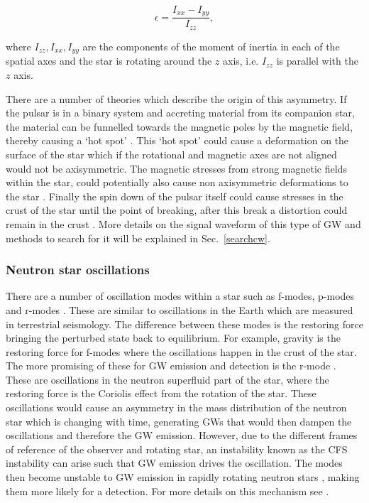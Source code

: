 \begin{equation}
\label{intro:source:cw:ellipticity}
\epsilon = \frac{I_{xx}-I_{yy}}{I_{zz}},
\end{equation}

where $I_{zz},I_{xx},I_{yy}$ are the components of the moment of inertia in each of the spatial axes and the star is rotating around the $z$ axis, i.e. $I_{zz}$ is parallel with the $z$ axis.

There are a number of theories which describe the origin of this asymmetry.
If the pulsar is in a binary system and accreting material from its companion
star, the material can be funnelled towards the magnetic poles by the magnetic
field, thereby causing a `hot spot' \citep{haskell2015DetectingGravitational}.
This `hot spot' could cause a deformation on the surface of the star which if the rotational and magnetic axes are not aligned would not be axisymmetric.  
The magnetic stresses from strong magnetic fields within the
star, could potentially also cause non axisymmetric deformations to the star
\citep{cutler2002GravitationalWaves}. Finally
the spin down of the pulsar itself could cause stresses in the crust of the
star until the point of breaking, after this break a
distortion could remain in the crust \citep{becker2009NeutronStars,ruderman1976CrustbreakingNeutron}.  
More details on the signal waveform of this type of \gls{GW} and methods to search for it will be explained in Sec.~\ref{searchcw}.
 
\subsubsection{Neutron star oscillations}
There are a number of oscillation modes within a star such as f-modes, p-modes
and r-modes \citep{becker2009NeutronStars}.  These are similar to oscillations
in the Earth which are measured in terrestrial seismology.  The difference
between these modes is the restoring force bringing the perturbed state back to
equilibrium.  For example, gravity is the restoring force for f-modes where the
oscillations happen in the crust of the star.  The more promising of these for
\gls{GW} emission and detection is the r-mode
\citep{owen2000GravitationalWaves}.
These are oscillations in the neutron superfluid part of the star, where the
restoring force is the Coriolis effect from the rotation of the star.  
These oscillations would cause an asymmetry in the mass distribution of the neutron star which is changing with time, generating \glspl{GW} that would then dampen the oscillations and therefore the \gls{GW} emission. However, due to the different frames of reference of the observer and rotating star, an instability known as the \gls{CFS} instability \citep{chandrasekhar1970SolutionsTwo} can arise such that \gls{GW} emission drives the oscillation. 
The modes then become unstable to \gls{GW} emission in rapidly rotating neutron
stars \citep{owen2000GravitationalWaves}, making them more likely for a
detection.  For more details on this mechanism see
\citep{owen2000GravitationalWaves,lasky2015GravitationalWaves,owen1998GravitationalWaves,jonesCFSInstability}.

